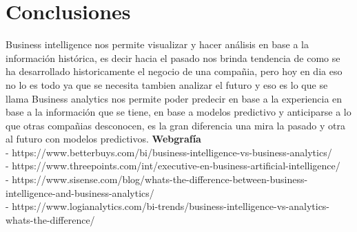 \section{Conclusiones} 

Business intelligence nos permite visualizar y hacer análisis en base a la información histórica,  es decir hacia el pasado nos brinda tendencia de como se ha desarrollado historicamente el negocio de una compañia, pero hoy en dia eso no lo es todo ya que se necesita tambien analizar el futuro y eso es lo que se llama Business analytics nos permite  poder predecir en base a la experiencia en base a la información que se tiene,  en base a  modelos predictivo y anticiparse a lo que otras compañias  desconocen, es la gran diferencia una mira la pasado y otra al futuro con modelos predictivos.
\newline
\newline
\newline
\textbf{Webgrafía}\\
\newline
- https://www.betterbuys.com/bi/business-intelligence-vs-business-analytics/\\
- https://www.threepoints.com/int/executive-en-business-artificial-intelligence/\\
- https://www.sisense.com/blog/whats-the-difference-between-business-intelligence-and-business-analytics/\\
- https://www.logianalytics.com/bi-trends/business-intelligence-vs-analytics-whats-the-difference/
